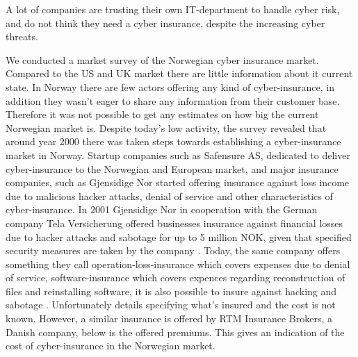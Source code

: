 A lot of companies are trusting their own IT-department to handle cyber risk, 
and do not think they need a cyber insurance, despite the increasing cyber threats. \cite{twatson}

We conducted a market survey of the Norwegian cyber insurance market. Compared to the US and UK market there are little information about it current state. 
In Norway there are few actors offering any kind of cyber-insurance, in addition they wasn't eager to share any information from their customer base.
Therefore it was not possible to get any estimates on how big the current Norwegian market is. Despite today's low activity, the survey revealed that around year 2000 there was taken steps towards establishing a cyber-insurance market in Norway. Startup companies such as Safensure AS, 
dedicated to deliver cyber-insurance to the Norwegian and European market, and major insurance companies, such as Gjensidige Nor
started offering insurance against loss income due to malicious hacker attacks, denial of service and other characteristics of cyber-insurance. 
In 2001 Gjensidige Nor in cooperation with the German company Tela Versicherung offered businesses insurance against financial losses due to hacker attacks and sabotage for up to 5 million NOK, given that specified security measures are taken by the company \cite{dagensithackerforsikring}. Today, the same company 
offers something they call operation-loss-insurance which covers expenses due to denial of service, software-insurance which covers expences regarding reconstruction of files and reinstalling software, it is also possible to insure against hacking and sabotage \citep{gjensidige}. Unfortunately details specifying what's insured and the cost is not known. However, a similar insurance is offered by RTM Insurance Brokers, a Danish company, below is the offered premiums. This gives an indication of the cost of cyber-insurance in the Norwegian market. \cite{RTM}



